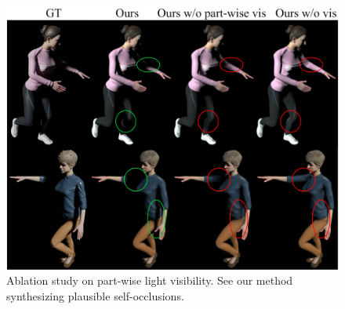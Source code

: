 \begin{figure}[t]
\begin{center}
   \includegraphics[width=1.0\linewidth]{./fig/ablation_lvis.jpg}
\end{center}
\caption{Ablation study on part-wise light visibility. See our method synthesizing plausible self-occlusions.}
\label{fig:ablation_lvis}
\end{figure}

